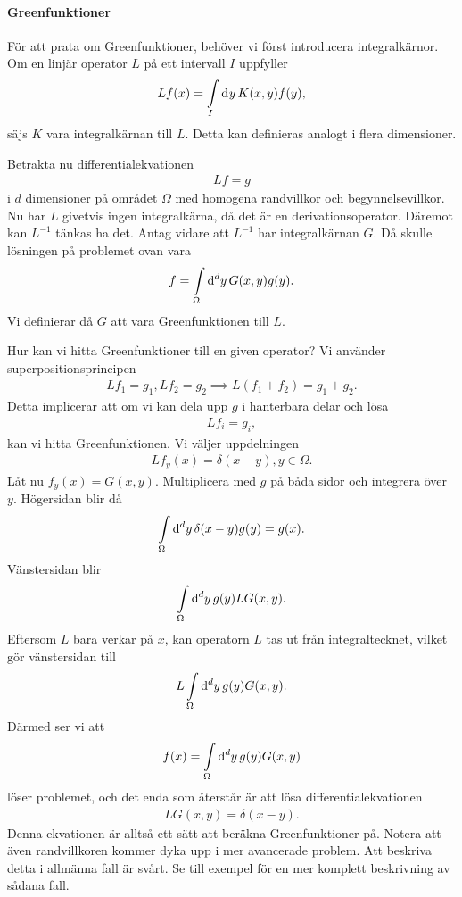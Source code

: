 \paragraph{Greenfunktioner}
För att prata om Greenfunktioner, behöver vi först introducera integralkärnor. Om en linjär operator $L$ på ett intervall $I$ uppfyller
\begin{align*}
	Lf(x) = \int\limits_{I}\dd[]{y}K(x, y)f(y),
\end{align*}
säjs $K$ vara integralkärnan till $L$. Detta kan definieras analogt i flera dimensioner.

Betrakta nu differentialekvationen
\begin{align*}
	Lf = g
\end{align*}
i $d$ dimensioner på området $\Omega$ med homogena randvillkor och begynnelsevillkor. Nu har $L$ givetvis ingen integralkärna, då det är en derivationsoperator. Däremot kan $L^{-1}$ tänkas ha det. Antag vidare att $L^{-1}$ har integralkärnan $G$. Då skulle lösningen på problemet ovan vara
\begin{align*}
	f = \int\limits_{\Omega}\dd[d]{y}G(x, y)g(y).
\end{align*}
Vi definierar då $G$ att vara Greenfunktionen till $L$.

Hur kan vi hitta Greenfunktioner till en given operator? Vi använder superpositionsprincipen
\begin{align*}
	Lf_{1} = g_{1}, Lf_{2} = g_{2} \implies L(f_{1} + f_{2}) = g_{1} + g_{2}.
\end{align*}
Detta implicerar att om vi kan dela upp $g$ i hanterbara delar och lösa
\begin{align*}
	Lf_{i} = g_{i},
\end{align*}
kan vi hitta Greenfunktionen. Vi väljer uppdelningen
\begin{align*}
	Lf_{y}(x) = \delta(x - y), y\in\Omega.
\end{align*}
Låt nu $f_{y}(x) = G(x, y)$. Multiplicera med $g$ på båda sidor och integrera över $y$. Högersidan blir då
\begin{align*}
	\int\limits_{\Omega}\dd[d]{y}\delta(x - y)g(y) = g(x).
\end{align*}
Vänstersidan blir
\begin{align*}
	\int\limits_{\Omega}\dd[d]{y}g(y)LG(x, y).
\end{align*}
Eftersom $L$ bara verkar på $x$, kan operatorn $L$ tas ut från integraltecknet, vilket gör vänstersidan till
\begin{align*}
	L\int\limits_{\Omega}\dd[d]{y}g(y)G(x, y).
\end{align*}
Därmed ser vi att
\begin{align*}
	f(x) = \int\limits_{\Omega}\dd[d]{y}g(y)G(x, y)
\end{align*}
löser problemet, och det enda som återstår är att lösa differentialekvationen
\begin{align*}
	LG(x, y) = \delta(x - y).
\end{align*}
Denna ekvationen är alltså ett sätt att beräkna Greenfunktioner på. Notera att även randvillkoren kommer dyka upp i mer avancerade problem. Att beskriva detta i allmänna fall är svårt. Se till exempel för en mer komplett beskrivning av sådana fall.